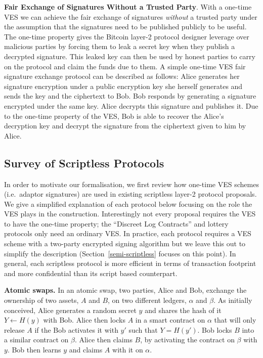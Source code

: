 \documentclass[fullpage]{article}
\theoremstyle{definition}
\begin{document}
\textbf{Fair Exchange of Signatures Without a Trusted Party}. With a one-time VES we can achieve the fair exchange of signatures \emph{without} a trusted party under the assumption that the signatures need to be published publicly to be useful. The one-time property gives the Bitcoin layer-2 protocol designer leverage over malicious parties by forcing them to leak a secret key when they publish a decrypted signature. This leaked key can then be used by honest parties to carry on the protocol and claim the funds due to them. A simple one-time VES fair signature exchange protocol can be described as follows: Alice generates her signature encryption under a public encryption key she herself generates and sends the key and the ciphertext to Bob. Bob responds by generating a signature encrypted under the same key. Alice decrypts this signature and publishes it. Due to the one-time property of the VES, Bob is able to recover the Alice's decryption key and decrypt the signature from the ciphertext given to him by Alice.


\subsection{Survey of Scriptless Protocols}
\label{exisitng-protocols}

In order to motivate our formalisation, we first review how one-time VES schemes (i.e.\ adaptor signatures) are used in existing scriptless layer-2 protocol proposals. We give a simplified explanation of each protocol below focusing on the role the VES plays in the construction. Interestingly not every proposal requires the VES to have the one-time property; the ``Discreet Log Contracts'' and lottery protocols only need an ordinary VES\@. In practice, each protocol requires a VES scheme with a two-party encrypted signing algorithm but we leave this out to simplify the description (Section~\ref{semi-scriptless} focuses on this point). In general, each scriptless protocol is more efficient in terms of transaction footprint and more confidential than its script based counterpart.

\hfill \break \textbf{Atomic swaps.}  In an atomic swap, two parties, Alice and Bob, exchange the ownership of two assets, $A$ and $B$, on two different ledgers, $\alpha$ and $\beta$. As initially conceived\cite{atomic-swap}, Alice generates a random secret $y$ and shares the hash of it $Y \gets H(y)$ with Bob. Alice then locks $A$ in a smart contract on $\alpha$ that will only release $A$ if the Bob activates it with $y'$ such that $Y = H(y')$. Bob locks $B$ into a similar contract on $\beta$. Alice then claims $B$, by activating the contract on $\beta$ with $y$. Bob then learns $y$ and claims $A$ with it on $\alpha$.
\end{document}
